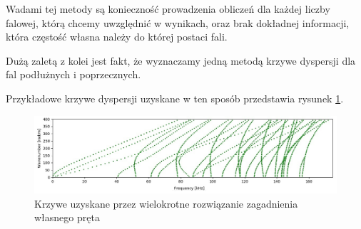 Wadami tej metody są konieczność prowadzenia obliczeń dla każdej liczby falowej, którą chcemy uwzględnić w wynikach, oraz brak dokładnej informacji, która częstość własna należy do której postaci fali.

Dużą zaletą z kolei jest fakt, że wyznaczamy jedną metodą krzywe dyspersji dla fal podłużnych i poprzecznych.

Przykładowe krzywe dyspersji uzyskane w ten sposób przedstawia rysunek \ref{fig:przykladowe_krzywe}.

\begin{figure}[h]
\centering
\includegraphics[width=14cm]{Zdjecia/2/przykladowe_krzywe}
\caption{Krzywe uzyskane przez wielokrotne rozwiązanie zagadnienia własnego pręta}
\label{fig:przykladowe_krzywe}
\end{figure}

